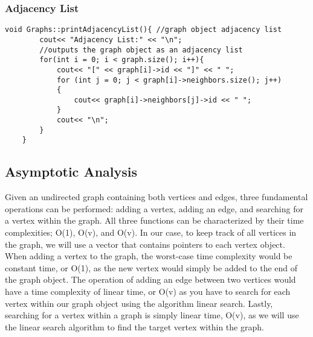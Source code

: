 \documentclass[letterpaper, 10pt,DIV=13]{scrartcl}
\numberwithin{equation}{section} %
\numberwithin{figure}{section} %
\numberwithin{table}{section} %
\begin{document}
\subsubsection*{Adjacency List}
    \lstset{numbers=left, numberstyle=\tiny, stepnumber=1, numbersep=5pt, basicstyle=\footnotesize\ttfamily}
    \begin{lstlisting}[frame=single, ]
   void Graphs::printAdjacencyList(){ //graph object adjacency list
        cout<< "Adjacency List:" << "\n";
        //outputs the graph object as an adjacency list
        for(int i = 0; i < graph.size(); i++){
            cout<< "[" << graph[i]->id << "]" << " ";
            for (int j = 0; j < graph[i]->neighbors.size(); j++)
            {
                cout<< graph[i]->neighbors[j]->id << " ";
            }
            cout<< "\n";
        }
    }

\end{lstlisting}

\subsection{Asymptotic Analysis}
Given an undirected graph containing both vertices and edges, three fundamental operations can be performed: adding a vertex, adding an edge, and searching for a vertex within the graph. All three functions can be characterized by their time complexities; O(1), O(v), and O(v). In our case, to keep track of all vertices in the graph, we will use a vector that contains pointers to each vertex object. When adding a vertex to the graph, the worst-case time complexity would be constant time, or O(1), as the new vertex would simply be added to the end of the graph object. The operation of adding an edge between two vertices would have a time complexity of linear time, or O(v) as you have to search for each vertex within our graph object using the algorithm linear search. Lastly, searching for a vertex within a graph is simply linear time, O(v), as we will use the linear search algorithm to find the target vertex within the graph.


\pagebreak
\end{document}
